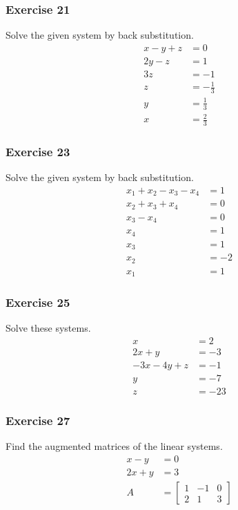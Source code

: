 \documentclass[letterpaper, 12pt]{math}
\begin{document}
\subsubsection*{Exercise 21}
Solve the given system by back substitution.
\begin{align*}
  x-y+z &= 0 \\
  2y-z &= 1 \\
  3z &= -1 \\
  z &= -\frac{1}{3} \\
  y &= \frac{1}{3} \\
  x &= \frac{2}{3}
\end{align*}

\subsubsection*{Exercise 23}
Solve the given system by back substitution.
\begin{align*}
  x_1+x_2-x_3-x_4 &= 1 \\
  x_2+x_3+x_4 &= 0 \\
  x_3-x_4 &= 0 \\
  x_4 &= 1 \\
  x_3 &= 1 \\
  x_2 &= -2 \\
  x_1 &= 1
\end{align*}

\subsubsection*{Exercise 25}
Solve these systems.
\begin{align*}
  x &= 2 \\
  2x+y &= -3 \\
  -3x-4y+z &= -1 \\
  y &= -7 \\
  z &= -23
\end{align*}

\subsubsection*{Exercise 27}
Find the augmented matrices of the linear systems.
\begin{align*}
  x-y &= 0 \\
  2x+y &= 3 \\
  A &= \left[\begin{array}{cc|c}
    1 & -1 & 0 \\
    2 & 1 & 3
  \end{array}\right]
\end{align*}
\end{document}
